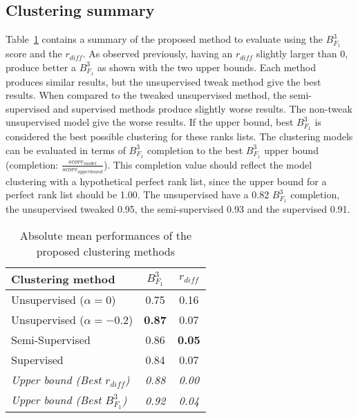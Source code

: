 \subsection{Clustering summary}

Table~\ref{tab:clustering_evaluation_summary} contains a summary of the proposed method to evaluate using the $B^3_{F_1}$ score and the $r_{diff}$.
As observed previously, having an $r_{diff}$ slightly larger than 0, produce better a $B^3_{F_1}$ as shown with the two upper bounds.
Each method produces similar results, but the unsupervised tweak method give the best results.
When compared to the tweaked unsupervised method, the semi-supervised and supervised methods produce slightly worse results.
The non-tweak unsupervised model give the worse results.
If the upper bound, best $B^3_{F_1}$ is considered the best possible clustering for these ranks lists.
The clustering models can be evaluated in terms of $B^3_{F_1}$ completion to the best $B^3_{F_1}$ upper bound (completion: $\frac{score_{model}}{score_{upper bound}}$).
This completion value should reflect the model clustering with a hypothetical perfect rank list, since the upper bound for a perfect rank list should be 1.00.
The unsupervised have a 0.82 $B^3_{F_1}$ completion, the unsupervised tweaked 0.95, the semi-supervised 0.93 and the supervised 0.91.

\begin{table}
  \centering
  \caption{Absolute mean performances of the proposed clustering methods}
  \label{tab:clustering_evaluation_summary}
  \begin{tabular}{l c c}
    \toprule
    Clustering method              & $B^3_{F_1}$ & $r_{diff}$ \\
    \midrule
    Unsupervised ($\alpha = 0$)    & 0.75 & 0.16 \\
    Unsupervised ($\alpha = -0.2$) & \textbf{0.87} & 0.07 \\
    Semi-Supervised                & 0.86 & \textbf{0.05} \\
    Supervised                     & 0.84 & 0.07 \\
    \midrule
    \textit{Upper bound (Best $r_{diff}$)}  & \textit{0.88} & \textit{0.00} \\
    \textit{Upper bound (Best $B^3_{F_1}$)} & \textit{0.92} & \textit{0.04} \\
    \bottomrule
  \end{tabular}
\end{table}
